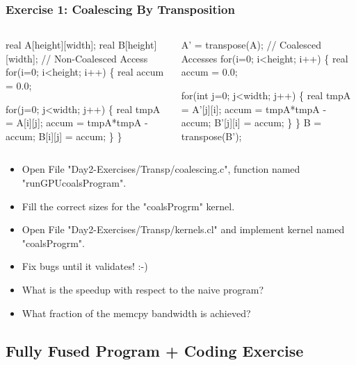 \documentclass{beamer}
\renewcommand{\emph}[1]{\textcolor{CosGreen}{ #1}}
\newcommand{\emp}[1]{\textcolor{DikuRed}{ #1}}
\begin{document}
\begin{frame}[fragile,t]
  \frametitle{Exercise 1: Coalescing By Transposition} 

\begin{columns}
\begin{colorcode}[fontsize=\scriptsize]
real A[height][width];
real B[height][width];
// Non-Coalesced Access
\emph{for(i=0; i<height; i++) \{}
  real accum  = 0.0;

  \emp{for(j=0; j<width; j++) \{}
    real tmpA = A[i][j];
    accum = tmpA*tmpA - accum;
    B[i][j] = accum;
\} \}\pause
\end{colorcode}
\begin{colorcode}[fontsize=\scriptsize]
A' = transpose(A);
// Coalesced Accesses
\emph{for(i=0; i<height; i++) \{}
  real accum = 0.0;

  \emp{for(int j=0; j<width; j++) \{}
    real tmpA = A'[j][i];
    accum = tmpA*tmpA - accum;
    B'[j][i] = accum;
\} \}
B = transpose(B');
\end{colorcode}
\end{columns}
\bigskip

\begin{itemize}
    \item Open File "Day2-Exercises/Transp/coalescing.c", function named "runGPUcoalsProgram".
    \item Fill the correct sizes for the "coalsProgrm" kernel.
    \item Open File "Day2-Exercises/Transp/kernels.cl" and implement kernel named "coalsProgrm".
    \item Fix bugs until it validates! :-)
    \item What is the speedup with respect to the naive program?
    \item What fraction of the memcpy bandwidth is achieved? 
\end{itemize}


\end{frame}

\subsection{Fully Fused Program + Coding Exercise}
\end{document}
